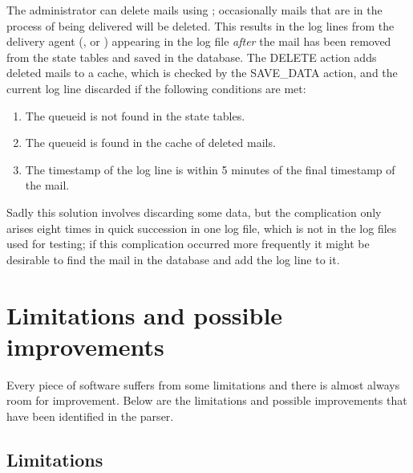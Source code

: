 \label{Mails deleted during delivery}

The administrator can delete mails using ; occasionally
mails that are in the process of being delivered will be deleted.  This
results in the log lines from the delivery agent (,
 or ) appearing in the log file
\textit{after\/} the mail has been removed from the state tables and saved
in the database.  The DELETE action adds deleted mails to a cache, which is
checked by the SAVE\_DATA action, and the current log line discarded if the
following conditions are met:

\begin{enumerate}

    \item The queueid is not found in the state tables. 

    \item The queueid is found in the cache of deleted mails.

    \item The timestamp of the log line is within 5 minutes of the final
        timestamp of the mail.

\end{enumerate}

Sadly this solution involves discarding some data, but the complication
only arises eight times in quick succession in one log file, which is not
in the \numberOFlogFILES{} log files used for testing; if this complication
occurred more frequently it might be desirable to find the mail in the
database and add the log line to it.

\section{Limitations and possible improvements}

\label{limitations-improvements}

Every piece of software suffers from some limitations and there is almost
always room for improvement.  Below are the limitations and possible
improvements that have been identified in the parser.

\subsection{Limitations}

\label{logging helo}

